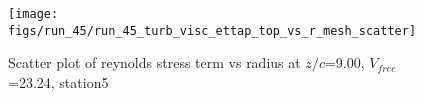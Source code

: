 \begin{figure}[H]
\centering
\texttt{[image: figs/run\_45/run\_45\_turb\_visc\_ettap\_top\_vs\_r\_mesh\_scatter]}
\caption{Scatter plot of reynolds stress term vs radius at $z/c$=9.00, $V_{free}$=23.24, station5}
\label{fig:run_45_turb_visc_ettap_top_vs_r_mesh_scatter}
\end{figure}



